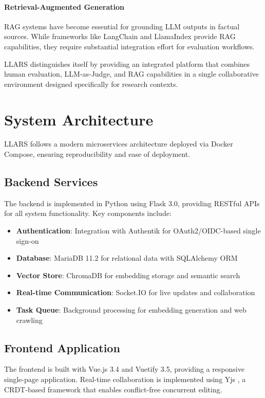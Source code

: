 \documentclass[11pt]{article}
\begin{document}
\paragraph{Retrieval-Augmented Generation}
RAG systems \cite{lewis2020retrieval} have become essential for grounding LLM outputs in factual sources.
While frameworks like LangChain and LlamaIndex provide RAG capabilities, they require substantial integration effort for evaluation workflows.

LLARS distinguishes itself by providing an integrated platform that combines human evaluation, LLM-as-Judge, and RAG capabilities in a single collaborative environment designed specifically for research contexts.

\section{System Architecture}

LLARS follows a modern microservices architecture deployed via Docker Compose, ensuring reproducibility and ease of deployment.

\subsection{Backend Services}

The backend is implemented in Python using Flask 3.0, providing RESTful APIs for all system functionality.
Key components include:

\begin{itemize}
    \item \textbf{Authentication}: Integration with Authentik for OAuth2/OIDC-based single sign-on
    \item \textbf{Database}: MariaDB 11.2 for relational data with SQLAlchemy ORM
    \item \textbf{Vector Store}: ChromaDB for embedding storage and semantic search
    \item \textbf{Real-time Communication}: Socket.IO for live updates and collaboration
    \item \textbf{Task Queue}: Background processing for embedding generation and web crawling
\end{itemize}

\subsection{Frontend Application}

The frontend is built with Vue.js 3.4 and Vuetify 3.5, providing a responsive single-page application.
Real-time collaboration is implemented using Yjs \cite{nicolaescu2016yjs}, a CRDT-based framework that enables conflict-free concurrent editing.
\end{document}
